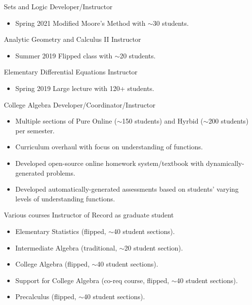 \documentclass[10pt,a4paper,sans]{moderncv}
\begin{document}
	\cventry{}
		{Sets and Logic}
		{Developer/Instructor}{}{}
		{\begin{itemize}
			\item Spring 2021 Modified Moore's Method with $\sim$30 students. 
		\end{itemize}}
	
	\cventry{}
		{Analytic Geometry and Calculus II}
		{Instructor}{}{}
		{\begin{itemize}
			\item Summer 2019 Flipped class with $\sim$20 students. 
		\end{itemize}}
	
	\cventry{}
		{Elementary Differential Equations}
		{Instructor}{}{}
		{\begin{itemize}
			\item Spring 2019 Large lecture with 120+ students.
		\end{itemize}}

	\cventry{}
		{College Algebra}
		{Developer/Coordinator/Instructor}{}{}
		{\begin{itemize}
				\item Multiple sections of Pure Online ($\sim$150 students) and Hyrbid ($\sim$200 students) per semester. 
				\item Curriculum overhaul with focus on understanding of functions.
				\item Developed open-source online homework system/textbook with dynamically-generated problems.
				\item Developed automatically-generated assessments based on students' varying levels of understanding functions.
		\end{itemize}}
	
		{Various courses}
		{Instructor of Record as graduate student}{}{}
		{\begin{itemize}
			\item Elementary Statistics (flipped, $\sim$40 student sections).
			\item Intermediate Algebra (traditional, $\sim$20 student section).
			\item College Algebra (flipped, $\sim$40 student sections).
			\item Support for College Algebra (co-req course, flipped, $\sim$40 student sections).
			\item Precalculus (flipped, $\sim$40 student sections).
		\end{itemize}}
	
\end{document}
